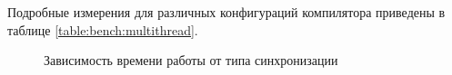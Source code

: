 Подробные измерения для различных конфигураций компилятора приведены в таблице \ref{table:bench:multithread}.


\begin{figure}

\caption{\label{plot:bench:cachetype} Зависимость времени работы от типа синхронизации}
\end{figure}

